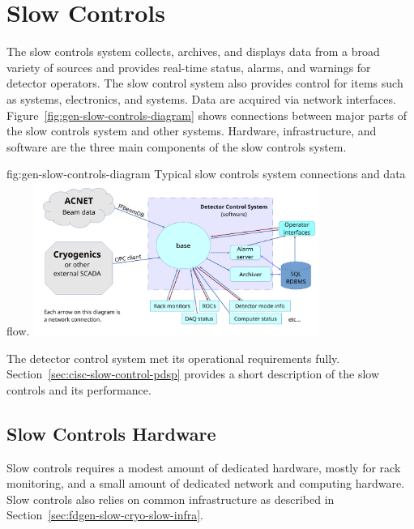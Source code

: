 \section{Slow Controls}

The slow controls system collects, archives, and displays data from
a broad variety of sources and provides real-time status, alarms, and warnings for detector operators. The slow control system also provides control for %
items such as  systems,  electronics, and  systems. Data are acquired via network interfaces.  Figure~\ref{fig:gen-slow-controls-diagram} shows connections between major parts of the slow controls system and other systems. Hardware, infrastructure, and software are the three main components of the slow controls system. %

\begin{dunefigure}{fig:gen-slow-controls-diagram}
{Typical slow controls system connections and data flow.}
\includegraphics[width=0.7\textwidth]{graphics/cisc_slow-controls-diagram}
\end{dunefigure}

The  detector control system\cite{pdspdcs_proc}  met its operational requirements fully. %
Section~\ref{sec:cisc-slow-control-pdsp} provides a short description of the  slow controls and its performance.

 \subsection{Slow Controls Hardware}
\label{sec:fdgen-slow-cryo-hdwr}

Slow controls requires a modest amount of dedicated hardware, mostly for rack monitoring,  %
and a small amount of dedicated network and
computing hardware. %
Slow controls also relies on common
infrastructure as described in
Section~\ref{sec:fdgen-slow-cryo-slow-infra}.

